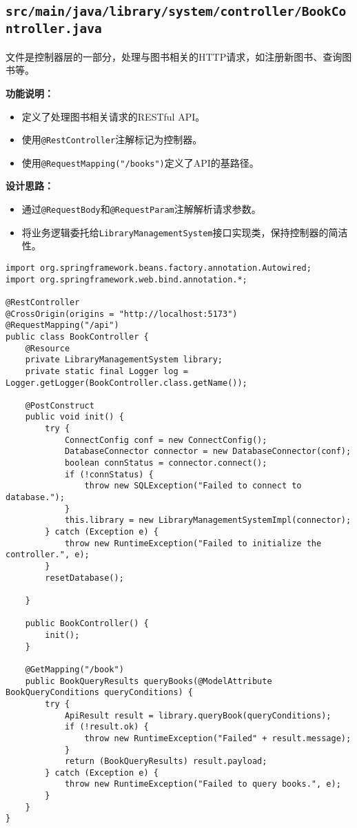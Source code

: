 \documentclass{ctexart}
\begin{document}
\subsection{\texttt{src/main/java/library/system/controller/BookController.java}}
文件是控制器层的一部分，处理与图书相关的HTTP请求，如注册新图书、查询图书等。

\textbf{功能说明：}
\begin{itemize}
    \item 定义了处理图书相关请求的RESTful API。
    \item 使用\texttt{@RestController}注解标记为控制器。
    \item 使用\texttt{@RequestMapping("/books")}定义了API的基路径。
\end{itemize}

\textbf{设计思路：}
\begin{itemize}
    \item 通过\texttt{@RequestBody}和\texttt{@RequestParam}注解解析请求参数。
    \item 将业务逻辑委托给\texttt{LibraryManagementSystem}接口实现类，保持控制器的简洁性。
\end{itemize}

\begin{lstlisting}[caption=\texttt{library.system.controller/BookController.java}]
import org.springframework.beans.factory.annotation.Autowired;
import org.springframework.web.bind.annotation.*;

@RestController
@CrossOrigin(origins = "http://localhost:5173")
@RequestMapping("/api")
public class BookController {
    @Resource
    private LibraryManagementSystem library;
    private static final Logger log = Logger.getLogger(BookController.class.getName());

    @PostConstruct
    public void init() {
        try {
            ConnectConfig conf = new ConnectConfig();
            DatabaseConnector connector = new DatabaseConnector(conf);
            boolean connStatus = connector.connect();
            if (!connStatus) {
                throw new SQLException("Failed to connect to database.");
            }
            this.library = new LibraryManagementSystemImpl(connector);
        } catch (Exception e) {
            throw new RuntimeException("Failed to initialize the controller.", e);
        }
        resetDatabase();

    }

    public BookController() {
        init();
    }

    @GetMapping("/book")
    public BookQueryResults queryBooks(@ModelAttribute BookQueryConditions queryConditions) {
        try {
            ApiResult result = library.queryBook(queryConditions);
            if (!result.ok) {
                throw new RuntimeException("Failed" + result.message);
            }
            return (BookQueryResults) result.payload;
        } catch (Exception e) {
            throw new RuntimeException("Failed to query books.", e);
        }
    }
}
\end{lstlisting}
\end{document}
